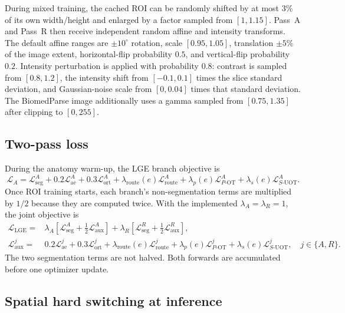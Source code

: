 \documentclass[10pt]{article}
\newcommand{\cL}{\mathcal{L}}
\begin{document}
During mixed training, the cached ROI can be randomly shifted by at most $3\%$
of its own width/height and enlarged by a factor sampled from $[1,1.15]$.  Pass~A
and Pass~R then receive independent random affine and intensity transforms.  The
default affine ranges are $\pm10^\circ$ rotation, scale $[0.95,1.05]$,
translation $\pm5\%$ of the image extent, horizontal-flip probability $0.5$, and
vertical-flip probability $0.2$.  Intensity perturbation is applied with
probability $0.8$: contrast is sampled from $[0.8,1.2]$, the intensity shift from
$[-0.1,0.1]$ times the slice standard deviation, and Gaussian-noise scale from
$[0,0.04]$ times that standard deviation.  The BiomedParse image additionally
uses a gamma sampled from $[0.75,1.35]$ after clipping to $[0,255]$.

\subsection{Two-pass loss}

During the anatomy warm-up, the LGE branch objective is
\begin{equation}
    \cL_{A}=\cL^{A}_{\mathrm{seg}}
      +0.2\cL^{A}_{\mathrm{ae}}
      +0.3\cL^{A}_{\mathrm{ort}}
      +\lambda_{\mathrm{route}}(e)\cL^{A}_{\mathrm{route}}
      +\lambda_p(e)\cL^{A}_{P\text{-OT}}
      +\lambda_s(e)\cL^{A}_{S\text{-UOT}}.
\end{equation}
Once ROI training starts, each branch's non-segmentation terms are multiplied by
$1/2$ because they are computed twice.  With the implemented
$\lambda_A=\lambda_R=1$, the joint objective is
\begin{equation}
\begin{split}
    \cL_{\mathrm{LGE}}={}&\lambda_A\left[
      \cL^{A}_{\mathrm{seg}}+\tfrac12\cL^{A}_{\mathrm{aux}}
      \right]
      +\lambda_R\left[
      \cL^{R}_{\mathrm{seg}}+\tfrac12\cL^{R}_{\mathrm{aux}}
      \right],\\
    \cL^{j}_{\mathrm{aux}}={}&
      0.2\cL^{j}_{\mathrm{ae}}
      +0.3\cL^{j}_{\mathrm{ort}}
      +\lambda_{\mathrm{route}}(e)\cL^{j}_{\mathrm{route}}
      +\lambda_p(e)\cL^{j}_{P\text{-OT}}
      +\lambda_s(e)\cL^{j}_{S\text{-UOT}},
      \quad j\in\{A,R\}.
    \label{eq:lge-joint-loss}
\end{split}
\end{equation}
The two segmentation terms are not halved.  Both forwards are accumulated before
one optimizer update.

\subsection{Spatial hard switching at inference}
\end{document}
